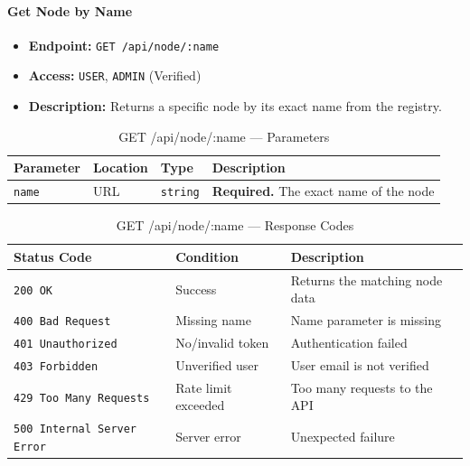 \paragraph{Get Node by Name}
\label{subsubsec:get-node-by-name}

\begin{itemize}
  \item \textbf{Endpoint:} \texttt{GET /api/node/:name}
  \item \textbf{Access:} \texttt{USER}, \texttt{ADMIN} (Verified)
  \item \textbf{Description:} Returns a specific node by its exact name from the registry.
\end{itemize}

\begin{table}[H]
\centering
\renewcommand{\arraystretch}{1.3}
\begin{tabularx}{\textwidth}{|l|l|l|X|}
\hline
\textbf{Parameter} & \textbf{Location} & \textbf{Type} & \textbf{Description} \\
\hline
\texttt{name}  & URL & \texttt{string}  & \textbf{Required.} The exact name of the node \\
\hline
\end{tabularx}
\caption{GET /api/node/:name — Parameters}
\label{tab:get-node-by-name-params}
\end{table}

\begin{table}[H]
\centering
\renewcommand{\arraystretch}{1.3}
\begin{tabularx}{\textwidth}{|l|l|X|}
\hline
\textbf{Status Code} & \textbf{Condition} & \textbf{Description} \\
\hline
\texttt{200 OK}           & Success          & Returns the matching node data \\
\hline
\texttt{400 Bad Request}  & Missing name     & Name parameter is missing \\
\hline
\texttt{401 Unauthorized} & No/invalid token & Authentication failed \\
\hline
\texttt{403 Forbidden}    & Unverified user  & User email is not verified \\
\hline
\texttt{429 Too Many Requests} & Rate limit exceeded & Too many requests to the API \\
\hline
\texttt{500 Internal Server Error} & Server error & Unexpected failure \\
\hline
\end{tabularx}
\caption{GET /api/node/:name — Response Codes}
\label{tab:get-node-by-name-responses}
\end{table}
\FloatBarrier

